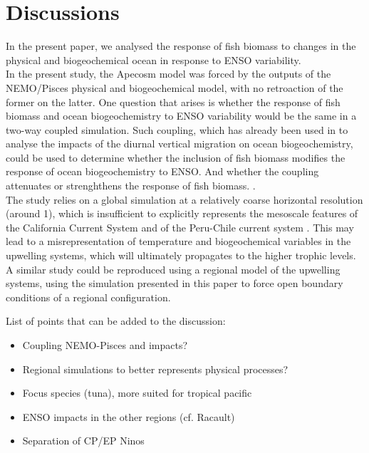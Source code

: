 \section{Discussions}

In the present paper, we analysed the response of fish biomass to changes in the physical and biogeochemical ocean in response to ENSO variability. \\

In the present study, the Apecosm model was forced by the outputs of the NEMO/Pisces physical and biogeochemical model, with no retroaction of the former on the latter. One question that arises is whether the response of fish biomass and ocean biogeochemistry to ENSO variability would be the same in a two-way coupled simulation. 	Such coupling, which has already been used in \cite{aumontEvaluatingPotentialImpacts2018} to analyse the impacts of the diurnal vertical migration on ocean biogeochemistry, could be used to determine whether the inclusion of fish biomass modifies the response of ocean biogeochemistry to ENSO. And whether the coupling attenuates or strenghthens the response of fish biomass. . \\

The study relies on a global simulation at a relatively coarse horizontal resolution (around 1\degree), which is insufficient to 
explicitly represents the mesoscale features of the California Current System \citep{capetMesoscaleSubmesoscaleTransition2008} and
of the Peru-Chile current system \citep{colasHeatBalanceEddies2012}. This may lead to a misrepresentation of temperature and biogeochemical variables in the upwelling systems, which will ultimately propagates to the higher trophic levels. A similar study
could be reproduced using a regional model of the upwelling systems, using the simulation presented in this paper to force open boundary conditions of a regional configuration. 

List of points that can be added to the discussion:

\begin{itemize}
    \item Coupling NEMO-Pisces and impacts?
    \item Regional simulations to better represents physical processes?
    \item Focus species (tuna), more suited for tropical pacific
    \item ENSO impacts in the other regions (cf. Racault)
    \item Separation of CP/EP Ninos
\end{itemize}

